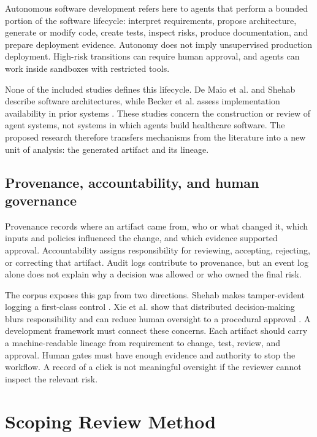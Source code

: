 \documentclass[11pt,a4paper]{article}
\begin{document}
Autonomous software development refers here to agents that perform a bounded portion of the software lifecycle: interpret requirements, propose architecture, generate or modify code, create tests, inspect risks, produce documentation, and prepare deployment evidence. Autonomy does not imply unsupervised production deployment. High-risk transitions can require human approval, and agents can work inside sandboxes with restricted tools.

None of the included studies defines this lifecycle. De Maio et al. and Shehab describe software architectures, while Becker et al. assess implementation availability in prior systems \cite{demaio2025privacy,shehab2025agentic,becker2018survey}. These studies concern the construction or review of agent systems, not systems in which agents build healthcare software. The proposed research therefore transfers mechanisms from the literature into a new unit of analysis: the generated artifact and its lineage.

\subsection{Provenance, accountability, and human governance}

Provenance records where an artifact came from, who or what changed it, which inputs and policies influenced the change, and which evidence supported approval. Accountability assigns responsibility for reviewing, accepting, rejecting, or correcting that artifact. Audit logs contribute to provenance, but an event log alone does not explain why a decision was allowed or who owned the final risk.

The corpus exposes this gap from two directions. Shehab makes tamper-evident logging a first-class control \cite[pp.~2--4]{shehab2025agentic}. Xie et al. show that distributed decision-making blurs responsibility and can reduce human oversight to a procedural approval \cite[pp.~6--11]{xie2026ethical}. A development framework must connect these concerns. Each artifact should carry a machine-readable lineage from requirement to change, test, review, and approval. Human gates must have enough evidence and authority to stop the workflow. A record of a click is not meaningful oversight if the reviewer cannot inspect the relevant risk.

\section{Scoping Review Method}
\end{document}
